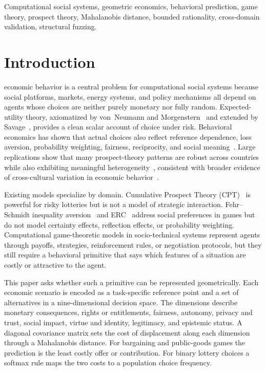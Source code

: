 \documentclass[journal]{IEEEtran}
\begin{document}
\begin{IEEEkeywords}
Computational social systems, geometric economics, behavioral prediction, game theory, prospect theory, Mahalanobis distance, bounded rationality, cross-domain validation, structural fuzzing.
\end{IEEEkeywords}


\section{Introduction}
\label{sec:intro}

 economic behavior is a central problem for computational social systems because social platforms, markets, energy systems, and policy mechanisms all depend on agents whose choices are neither purely monetary nor fully random.
Expected-utility theory, axiomatized by von~Neumann and Morgenstern~\cite{vonneumann1944} and extended by Savage~\cite{savage1954}, provides a clean scalar account of choice under risk.
Behavioral economics has shown that actual choices also reflect reference dependence, loss aversion, probability weighting, fairness, reciprocity, and social meaning~\cite{kahneman1979,tversky1992,fehr1999,bolton2000}.
Large replications show that many prospect-theory patterns are robust across countries while also exhibiting meaningful heterogeneity~\cite{ruggeri2020}, consistent with broader evidence of cross-cultural variation in economic behavior~\cite{henrich2010}.

Existing models specialize by domain.
Cumulative Prospect Theory (CPT)~\cite{tversky1992} is powerful for risky lotteries but is not a model of strategic interaction.
Fehr--Schmidt inequality aversion~\cite{fehr1999} and ERC~\cite{bolton2000} address social preferences in games but do not model certainty effects, reflection effects, or probability weighting.
Computational game-theoretic models in socio-technical systems represent agents through payoffs, strategies, reinforcement rules, or negotiation protocols, but they still require a behavioral primitive that says which features of a situation are costly or attractive to the agent.

This paper asks whether such a primitive can be represented geometrically.
Each economic scenario is encoded as a task-specific reference point and a set of alternatives in a nine-dimensional decision space.
The dimensions describe monetary consequences, rights or entitlements, fairness, autonomy, privacy and trust, social impact, virtue and identity, legitimacy, and epistemic status.
A diagonal covariance matrix sets the cost of displacement along each dimension through a Mahalanobis distance.
For bargaining and public-goods games the prediction is the least costly offer or contribution.
For binary lottery choices a softmax rule maps the two costs to a population choice frequency.
\end{document}
